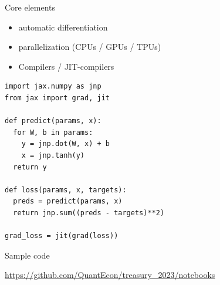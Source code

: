 \documentclass[
    xcolor={svgnames,dvipsnames},
    hyperref={colorlinks, citecolor=DeepPink4, linkcolor=DarkRed, urlcolor=DarkBlue}
    ]{beamer}  %
\newcommand{\1}{\mathbbm 1}
\begin{document}
\begin{frame}
    

    Core elements
    \begin{itemize}
        \item automatic differentiation
        \vspace{0.5em}
        \item parallelization (CPUs / GPUs / TPUs)
        \vspace{0.5em}
        \item Compilers / JIT-compilers
    \end{itemize}

\end{frame}


\begin{frame}[fragile]
    
    \begin{verbatim}
import jax.numpy as jnp
from jax import grad, jit

def predict(params, x):
  for W, b in params:
    y = jnp.dot(W, x) + b
    x = jnp.tanh(y)  
  return y                

def loss(params, x, targets):
  preds = predict(params, x)
  return jnp.sum((preds - targets)**2)

grad_loss = jit(grad(loss))  
    \end{verbatim}

\end{frame}




\begin{frame}
    
    Sample code

    \url{https://github.com/QuantEcon/treasury_2023/notebooks}

\end{frame}
\end{document}
